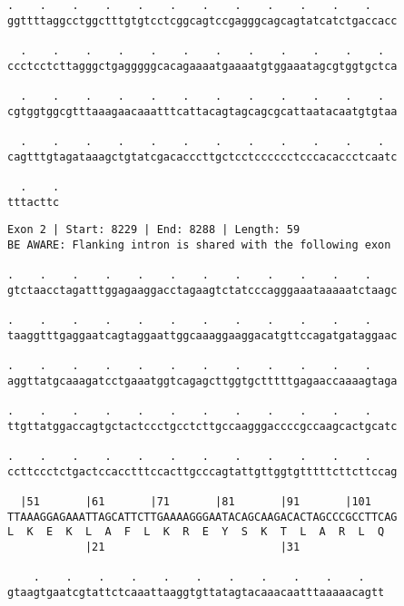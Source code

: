 \documentclass{article}
\begin{document}
\newpage
\begin{Verbatim}[fontfamily=courier]
  .    .    .    .    .    .    .    .    .    .    .    .  
ggttttaggcctggctttgtgtcctcggcagtccgagggcagcagtatcatctgaccacc

  .    .    .    .    .    .    .    .    .    .    .    .  
ccctcctcttagggctgagggggcacagaaaatgaaaatgtggaaatagcgtggtgctca

  .    .    .    .    .    .    .    .    .    .    .    .  
cgtggtggcgtttaaagaacaaatttcattacagtagcagcgcattaatacaatgtgtaa

  .    .    .    .    .    .    .    .    .    .    .    .  
cagtttgtagataaagctgtatcgacacccttgctcctcccccctcccacaccctcaatc

  .    .
tttacttc
\end{Verbatim}
\newpage
\begin{Verbatim}[fontfamily=courier]
Exon 2 | Start: 8229 | End: 8288 | Length: 59
BE AWARE: Flanking intron is shared with the following exon

.    .    .    .    .    .    .    .    .    .    .    .    
gtctaacctagatttggagaaggacctagaagtctatcccagggaaataaaaatctaagc

.    .    .    .    .    .    .    .    .    .    .    .    
taaggtttgaggaatcagtaggaattggcaaaggaaggacatgttccagatgataggaac

.    .    .    .    .    .    .    .    .    .    .    .    
aggttatgcaaagatcctgaaatggtcagagcttggtgctttttgagaaccaaaagtaga

.    .    .    .    .    .    .    .    .    .    .    .    
ttgttatggaccagtgctactccctgcctcttgccaagggaccccgccaagcactgcatc

.    .    .    .    .    .    .    .    .    .    .    .    
ccttccctctgactccacctttccacttgcccagtattgttggtgtttttcttcttccag

  |51       |61       |71       |81       |91       |101    
TTAAAGGAGAAATTAGCATTCTTGAAAAGGGAATACAGCAAGACACTAGCCCGCCTTCAG
L  K  E  K  L  A  F  L  K  R  E  Y  S  K  T  L  A  R  L  Q  
            |21                           |31               

    .    .    .    .    .    .    .    .    .    .    .   
gtaagtgaatcgtattctcaaattaaggtgttatagtacaaacaatttaaaaacagtt
\end{Verbatim}
\newpage
\end{document}
